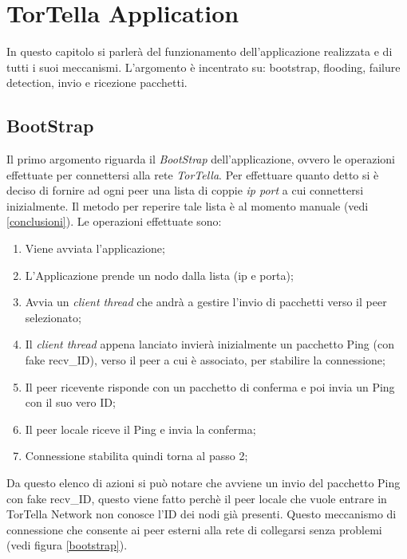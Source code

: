 \chapter{TorTella Application}
In questo capitolo si parlerà del funzionamento dell'applicazione realizzata e di tutti i suoi meccanismi. L'argomento è incentrato su: bootstrap, flooding, failure detection, invio e ricezione pacchetti.
\section{BootStrap}
Il primo argomento riguarda il \textit{BootStrap} dell'applicazione, ovvero le operazioni effettuate per connettersi alla rete \textit{TorTella}. Per effettuare quanto detto si è deciso di fornire ad ogni peer una lista di coppie \textit{ip port} a cui connettersi inizialmente. Il metodo per reperire tale lista è al momento manuale (vedi \ref{conclusioni}). Le operazioni effettuate sono:
\begin{enumerate}
\item Viene avviata l'applicazione;
\item L'Applicazione prende un nodo dalla lista (ip e porta);
\item Avvia un \textit{client thread} che andrà a gestire l'invio di pacchetti verso il peer selezionato;
\item Il \textit{client thread} appena lanciato invierà inizialmente un pacchetto Ping (con fake recv\_ID), verso il peer a cui è associato, per stabilire la connessione;
\item Il peer ricevente risponde con un pacchetto di conferma e poi invia un Ping con il suo vero ID;
\item Il peer locale riceve il Ping e invia la conferma;
\item Connessione stabilita quindi torna al passo 2;
\end{enumerate}
Da questo elenco di azioni si può notare che avviene un invio del pacchetto Ping con fake recv\_ID, questo viene fatto perchè il peer locale che vuole entrare in TorTella Network non conosce l'ID dei nodi già presenti. Questo meccanismo di connessione che consente ai peer esterni alla rete di collegarsi senza problemi (vedi figura \ref{bootstrap}).
